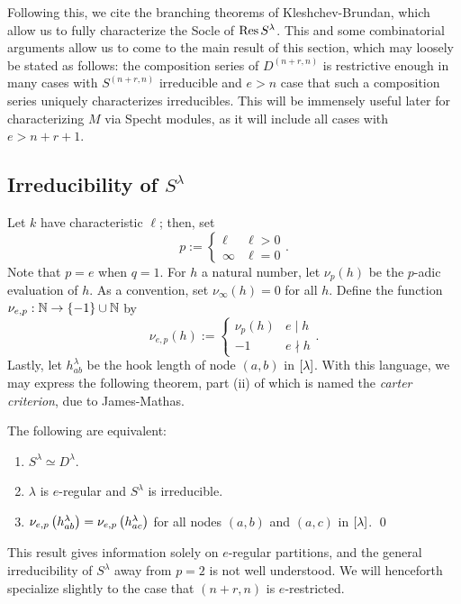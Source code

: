 \documentclass{amsart}
\begin{document}
  Following this, we cite the branching theorems of Kleshchev-Brundan, which allow us to fully characterize the Socle of $\operatorname{Res} S^{\lambda}$.
  This and some combinatorial arguments allow us to come to the main result of this section, which may loosely be stated as follows:
  the composition series of $D^{(n+r,n)}$ is restrictive enough in many cases with $S^{(n+r,n)}$ irreducible and $e > n$ case that such a composition series uniquely characterizes irreducibles.
  This will be immensely useful later for characterizing $M$ via Specht modules, as it will include all cases with $e > n + r + 1$.

  \subsection{Irreducibility of $S^\lambda$}
  Let $k$ have characteristic $\ell$;
  then, set
  \[
    p := \begin{cases}
      \ell & \ell > 0\\
      \infty & \ell = 0
    \end{cases}.
  \]
  Note that $p = e$ when $q = 1$.
  For $h$ a natural number, let $\nu_p(h)$ be the $p$-adic evaluation of $h$.
  As a convention, set $\nu_\infty(h) = 0$ for all $h$.
  Define the function $\nu_{e,p} : \mathbb{N} \rightarrow \left\{ -1 \right\} \cup \mathbb{N}$ by
  \[
    \nu_{e,p}(h) := \begin{cases}
      \nu_p(h) & e \mid h\\
      -1 & e \nmid h
    \end{cases}.
  \]
  Lastly, let $h_{ab}^\lambda$ be the hook length of node $(a,b)$ in $\left[ \lambda \right]$.
  With this language, we may express the following theorem, part (ii) of which is named the \emph{carter criterion}, due to James-Mathas.\cite{Mathas-book}
  \begin{theorem}
    The following are equivalent:
    \begin{enumerate}[label={(\roman*)}]
      \item $S^{\lambda} \simeq D^{\lambda}$.
      \item $\lambda$ is $e$-regular and $S^\lambda$ is irreducible.
      \item $\nu_{e,p}\left( h_{ab}^\lambda \right) = \nu_{e,p}\left( h_{ac}^\lambda \right)$ for all nodes $(a,b)$ and $(a,c)$ in $\left[ \lambda \right]$.
    \qed\end{enumerate}
  \end{theorem}
  This result gives information solely on $e$-regular partitions, and the general irreducibility of $S^\lambda$ away from $p=2$ is not well understood.
  We will henceforth specialize slightly to the case that $(n+r,n)$ is $e$-restricted. 
\end{document}
